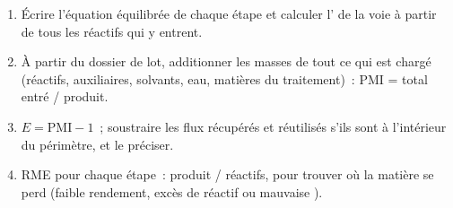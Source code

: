 \begin{method}\label{met:b3:green-industrial:metrics}
\begin{enumerate}
  \item Écrire l'équation équilibrée de chaque étape et calculer
        l' de la voie à partir de tous les réactifs qui y
        entrent.
  \item À partir du dossier de lot, additionner les masses de tout ce qui
        est chargé (réactifs, auxiliaires, solvants, eau, matières du
        traitement)~: PMI = total entré / produit.
  \item $E = \mathrm{PMI} - 1$~; soustraire les flux récupérés et réutilisés s'ils sont à l'intérieur du
        périmètre, et le préciser.
  \item RME pour chaque étape~: produit / réactifs, pour trouver où la
        matière se perd (faible rendement, excès de réactif ou mauvaise
        ).
\end{enumerate}
\end{method}

